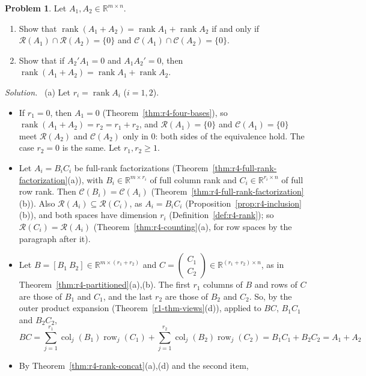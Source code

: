 \documentclass[12pt]{article}
\newcommand{\R}{\mathbb R}
\DeclareMathOperator{\row}{row}
\DeclareMathOperator{\col}{col}
\DeclareMathOperator{\rank}{rank}
\theoremstyle{definition}
\newtheorem{problem}{Problem}
\newenvironment{solution}{\par\noindent\textit{Solution.}\ }{\par\smallskip}
\begin{document}
\begin{problem}\label{r4-ex-pr-rank-additive}
Let \(A_1,A_2\in\R^{m\times n}\).
\begin{enumerate}
\item Show that \(\rank(A_1+A_2)=\rank A_1+\rank A_2\) if and only if \(\mathcal R(A_1)\cap\mathcal R(A_2)=\{0\}\) and
\(\mathcal C(A_1)\cap\mathcal C(A_2)=\{0\}\).
\item Show that if \(A_2'A_1=0\) and \(A_1A_2'=0\), then \(\rank(A_1+A_2)=\rank A_1+\rank A_2\).
\end{enumerate}
\end{problem}
\begin{solution}
(a) Let \(r_i=\rank A_i\) (\(i=1,2\)).
\begin{itemize}
\item If \(r_1=0\), then \(A_1=0\) (Theorem~\ref{thm:r4-four-bases}), so \(\rank(A_1+A_2)=r_2=r_1+r_2\), and
\(\mathcal R(A_1)=\{0\}\) and \(\mathcal C(A_1)=\{0\}\) meet \(\mathcal R(A_2)\) and \(\mathcal C(A_2)\) only in \(0\):
both sides of the equivalence hold. The case \(r_2=0\) is the same. Let \(r_1,r_2\geqslant1\).
\item Let \(A_i=B_iC_i\) be full-rank factorizations (Theorem~\ref{thm:r4-full-rank-factorization}(a)), with
\(B_i\in\R^{m\times r_i}\) of full column rank and \(C_i\in\R^{r_i\times n}\) of full row rank. Then
\(\mathcal C(B_i)=\mathcal C(A_i)\) (Theorem~\ref{thm:r4-full-rank-factorization}(b)). Also
\(\mathcal R(A_i)\subseteq\mathcal R(C_i)\), as \(A_i=B_iC_i\) (Proposition~\ref{prop:r4-inclusion}(b)), and both spaces
have dimension \(r_i\) (Definition~\ref{def:r4-rank}); so \(\mathcal R(C_i)=\mathcal R(A_i)\)
(Theorem~\ref{thm:r4-counting}(a), for row spaces by the paragraph after it).
\item Let \(B=[B_1\ B_2]\in\R^{m\times(r_1+r_2)}\) and
\(C=\left(\begin{smallmatrix}C_1\\C_2\end{smallmatrix}\right)\in\R^{(r_1+r_2)\times n}\), as in
Theorem~\ref{thm:r4-partitioned}(a),(b). The first \(r_1\) columns of \(B\) and rows of \(C\) are those of \(B_1\) and
\(C_1\), and the last \(r_2\) are those of \(B_2\) and \(C_2\). So, by the outer product expansion
(Theorem~\ref{r1-thm-views}(d)), applied to \(BC\), \(B_1C_1\) and \(B_2C_2\),
\[
BC=\sum_{j=1}^{r_1}\col_j(B_1)\row_j(C_1)+\sum_{j=1}^{r_2}\col_j(B_2)\row_j(C_2)=B_1C_1+B_2C_2=A_1+A_2
\]
\item By Theorem~\ref{thm:r4-rank-concat}(a),(d) and the second item,

\end{itemize}
\end{solution}
\end{document}
